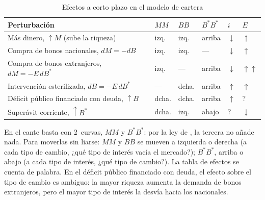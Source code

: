 \documentclass[11pt]{article}
\begin{document}
\begin{table}[H]
\centering
\caption{Efectos a corto plazo en el modelo de cartera}\label{tab:branson}
\small
\begin{tabular}{>{\raggedright\arraybackslash}m{5.4cm}>{\centering\arraybackslash}m{1.3cm}>{\centering\arraybackslash}m{1.3cm}>{\centering\arraybackslash}m{1.4cm}>{\centering\arraybackslash}m{1.1cm}>{\centering\arraybackslash}m{1.3cm}}
\toprule
\rowcolor{tceeazulpalido}\textbf{Perturbación} & $MM$ & $BB$ & $B^*B^*$ & $i$ & $E$\\
\midrule
Más dinero, $\uparrow M$ (sube la riqueza) & izq. & izq. & arriba & $\downarrow$ & \textcolor{tceerojo}{$\uparrow$}\\
Compra de bonos nacionales, $dM=-dB$ & izq. & izq. & --- & $\downarrow$ & \textcolor{tceerojo}{$\uparrow$}\\
Compra de bonos extranjeros, $dM=-E\,dB^*$ & izq. & --- & arriba & $\downarrow$ & \textcolor{tceerojo}{$\uparrow\uparrow$}\\
Intervención esterilizada, $dB=-E\,dB^*$ & --- & dcha. & arriba & $\uparrow$ & \textcolor{tceerojo}{$\uparrow$}\\
Déficit público financiado con deuda, $\uparrow B$ & dcha. & dcha. & arriba & $\uparrow$ & ?\\
Superávit corriente, $\uparrow B^*$ & dcha. & izq. & abajo & ? & \textcolor{tceeverde}{$\downarrow$}\\
\bottomrule
\end{tabular}
\end{table}

\begin{notaopositor}
En el cante basta con 2~curvas, $MM$ y $B^*B^*$: por la ley de , la tercera no añade nada. Para moverlas sin liarse: $MM$ y $BB$ se mueven a izquierda o derecha (a cada tipo de cambio, ¿qué tipo de interés vacía el mercado?); $B^*B^*$, arriba o abajo (a cada tipo de interés, ¿qué tipo de cambio?). La tabla de efectos se cuenta de palabra. En el déficit público financiado con deuda, el efecto sobre el tipo de cambio es ambiguo: la mayor riqueza aumenta la demanda de bonos extranjeros, pero el mayor tipo de interés la desvía hacia los nacionales.
\end{notaopositor}
\end{document}
